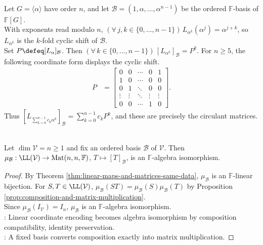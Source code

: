 \begin{example} \label{ex:cyclic-group-algebra-regular-matrices} \\
Let $G=\langle\alpha\rangle$ have order $n$, and let $\mathcal{B}=(1,\alpha,\ldots,\alpha^{n-1})$ be the ordered $\mathbb{F}$-basis of $\mathbb{F}[G]$.\\
With exponents read modulo $n$, $(\forall\,j,k\in\{0,\ldots,n-1\})\,L_{\alpha^k}(\alpha^j)=\alpha^{j+k}$, so $L_{\alpha^k}$ is the $k$-fold cyclic shift of $\mathcal{B}$.\\
Set $P\defeq[L_{\alpha}]_{\mathcal{B}}$. Then $(\forall\,k\in\{0,\ldots,n-1\})\,[L_{\alpha^k}]_{\mathcal{B}}=P^k$. For $n\geq5$, the following coordinate form displays the cyclic shift.
\begin{align*}
P&=
\begin{bmatrix}
0&0&\cdots&0&1\\
1&0&\cdots&0&0\\
0&1&\ddots&0&0\\
\vdots&\vdots&\ddots&\vdots&\vdots\\
0&0&\cdots&1&0
\end{bmatrix}.
\end{align*}
Thus $[L_{\sum\limits_{k=0}^{n-1}c_k\alpha^k}]_{\mathcal{B}}=\sum\limits_{k=0}^{n-1}c_kP^k$, and these are precisely the circulant matrices.
\end{example}

\begin{proposition} \label{prop:endomorphism-algebra-matrix-algebra-isomorphism} \\
Let $\dim\mathcal{V}=n\geq1$ and fix an ordered basis $\mathcal{B}$ of $\mathcal{V}$. Then $\mu_{\mathcal{B}}:\LL(\mathcal{V})\to\operatorname{Mat}(n,n,\mathbb{F})$, $T\mapsto[T]_{\mathcal{B}}$, is an $\mathbb{F}$-algebra isomorphism.
\begin{proof}
By Theorem \ref{thm:linear-maps-and-matrices-same-data}, $\mu_{\mathcal{B}}$ is an $\mathbb{F}$-linear bijection. For $S,T\in\LL(\mathcal{V})$, $\mu_{\mathcal{B}}(ST)=\mu_{\mathcal{B}}(S)\mu_{\mathcal{B}}(T)$ by Proposition \ref{prop:composition-and-matrix-multiplication}.\\
Since $\mu_{\mathcal{B}}(I_{\mathcal{V}})=I_n$, $\mu_{\mathcal{B}}$ is an $\mathbb{F}$-algebra isomorphism.\\
: Linear coordinate encoding becomes algebra isomorphism by composition compatibility, identity preservation.\\
: A fixed basis converts composition exactly into matrix multiplication.
\end{proof}
\end{proposition}

